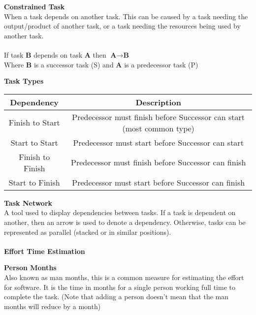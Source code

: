 \documentclass[a4paper,10pt]{article}
\begin{document}
\begin{shaded}
	\noindent \textcolor{Emerald}{\textbf{Constrained Task}} \\
	When a task depends on another task. This can be caused by a task needing the output/product of another task, or a task needing the resources being used by another task. \\\\
	If task \textbf{B} depends on task \textbf{A} then $\textbf{A} \rightarrow \textbf{B}$ \\
	Where \textbf{B} is a successor task (S) and \textbf{A} is a predecessor task (P)
\end{shaded}
\begin{shaded}
	\noindent \textcolor{Emerald}{\textbf{Task Types}} \\
	\begin{center}
		\begin{tabular}{|c|c|}
			\hline 
			\textbf{Dependency} &\textbf{Description} \\
			\hline 
			Finish to Start &Predecessor must finish before Successor can start (most common type) \\
			\hline
			Start to Start &Predecessor must start before Successor can start \\
			\hline 
			Finish to Finish &Predecessor must finish before Successor can finish \\
			\hline 
			Start to Finish &Predecessor must start before Successor can finish \\
			\hline
		\end{tabular}
	\end{center}
\end{shaded}
\noindent \textbf{Task Network} \\
A tool used to display dependencies between tasks. If a task is dependent on another, then an arrow is used to denote a dependency. Otherwise, tasks can be represented as parallel (stacked or in similar positions). \\\\
\newpage
\noindent \textcolor{BlueGreen}{\textbf{Effort Time Estimation}}
\begin{shaded}
	\noindent \textcolor{Emerald}{\textbf{Person Months}} \\
	Also known as man months, this is a common measure for estimating the effort for software. It is the time in months for a single person working full time to complete the task. (Note that adding a person doesn't mean that the man months will reduce by a month)
\end{shaded}
\end{document}
